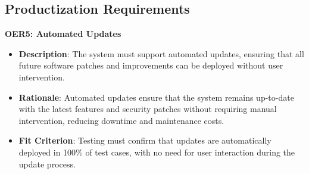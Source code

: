 \documentclass[12pt]{article}
\begin{document}
\subsection{Productization Requirements}
\textbf{OER5: Automated Updates}
\begin{itemize}
    \item \textbf{Description}: The system must support automated updates,
    ensuring that all future software patches and improvements can be deployed
    without user intervention.
    \item \textbf{Rationale}: Automated updates ensure that the system remains
    up-to-date with the latest features and security patches without requiring
    manual intervention, reducing downtime and maintenance costs.
    \item \textbf{Fit Criterion}: Testing must confirm that updates are
    automatically deployed in 100\% of test cases, with no need for user
    interaction during the update process.
\end{itemize}
\end{document}
